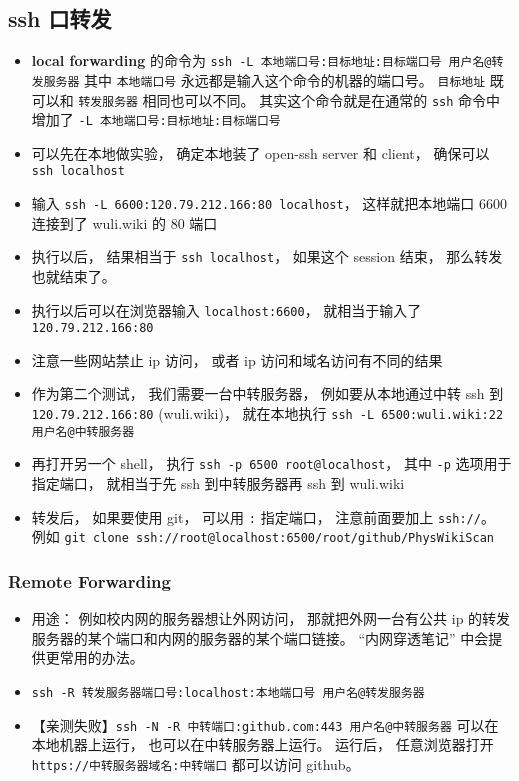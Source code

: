 \subsection{ssh 口转发}
\begin{itemize}
\item \textbf{local forwarding} 的命令为 \verb`ssh -L 本地端口号:目标地址:目标端口号 用户名@转发服务器` 其中 \verb`本地端口号` 永远都是输入这个命令的机器的端口号。 \verb`目标地址` 既可以和 \verb`转发服务器` 相同也可以不同。 其实这个命令就是在通常的 \verb`ssh` 命令中增加了 \verb`-L 本地端口号:目标地址:目标端口号`
\item 可以先在本地做实验， 确定本地装了 open-ssh server 和 client， 确保可以 \verb`ssh localhost`
\item 输入 \verb`ssh -L 6600:120.79.212.166:80 localhost`， 这样就把本地端口 6600 连接到了 wuli.wiki 的 80 端口
\item 执行以后， 结果相当于 \verb`ssh localhost`， 如果这个 session 结束， 那么转发也就结束了。
\item 执行以后可以在浏览器输入 \verb`localhost:6600`， 就相当于输入了 \verb`120.79.212.166:80`
\item 注意一些网站禁止 ip 访问， 或者 ip 访问和域名访问有不同的结果

\item 作为第二个测试， 我们需要一台中转服务器， 例如要从本地通过中转 ssh 到 \verb|120.79.212.166:80| (wuli.wiki)， 就在本地执行 \verb`ssh -L 6500:wuli.wiki:22 用户名@中转服务器`
\item 再打开另一个 shell， 执行 \verb`ssh -p 6500 root@localhost`， 其中 \verb`-p` 选项用于指定端口， 就相当于先 ssh 到中转服务器再 ssh 到 wuli.wiki

\item 转发后， 如果要使用 git， 可以用 \verb`:` 指定端口， 注意前面要加上 \verb`ssh://`。  例如 \verb`git clone ssh://root@localhost:6500/root/github/PhysWikiScan`
\end{itemize}

\subsubsection{Remote Forwarding}
\begin{itemize}
\item 用途： 例如校内网的服务器想让外网访问， 那就把外网一台有公共 ip 的转发服务器的某个端口和内网的服务器的某个端口链接。 “内网穿透笔记” 中会提供更常用的办法。
\item \verb`ssh -R 转发服务器端口号:localhost:本地端口号 用户名@转发服务器`
\item 【亲测失败】\verb|ssh -N -R 中转端口:github.com:443 用户名@中转服务器| 可以在本地机器上运行， 也可以在中转服务器上运行。 运行后， 任意浏览器打开 \verb|https://中转服务器域名:中转端口| 都可以访问 github。
\end{itemize}
